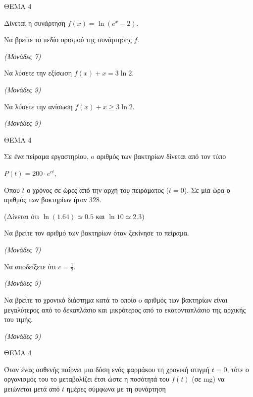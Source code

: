 \documentclass[11pt,a4paper,twoside]{book}
\newcommand{\monades}[1]{\hfill \textit{(Μονάδες #1)}}
\begin{document}
\vspace{4mm}

ΘΕΜΑ 4

Δίνεται η συνάρτηση $f(x) = \ln(e^x - 2)$.

\begin{alist}
\item Να βρείτε το πεδίο ορισμού της συνάρτησης $f$.

\monades{7}

\item Να λύσετε την εξίσωση $f(x) + x = 3\ln 2$.

\monades{9}

\item Να λύσετε την ανίσωση $f(x) + x \ge 3\ln 2$.

\monades{9}
\end{alist}

\vspace{4mm}

ΘΕΜΑ 4

Σε ένα πείραμα εργαστηρίου, o αριθμός των βακτηρίων δίνεται από τον τύπο

$P(t) = 200 \cdot e^{ct}$,

Όπου $t$ ο χρόνος σε ώρες από την αρχή του πειράματος ($t=0$). Σε μία ώρα ο αριθμός των βακτηρίων ήταν 328.

(Δίνεται ότι $\ln(1.64) \simeq 0.5$ και $\ln 10 \simeq 2.3$)

\begin{alist}
\item Να βρείτε τον αριθμό των βακτηρίων όταν ξεκίνησε το πείραμα.

\monades{7}

\item Να αποδείξετε ότι $c = \frac{1}{2}$.

\monades{9}

\item Να βρείτε το χρονικό διάστημα κατά το οποίο o αριθμός των βακτηρίων είναι μεγαλύτερος από το δεκαπλάσιο και μικρότερος από το εκατονταπλάσιο της αρχικής του τιμής.

\monades{9}
\end{alist}

\vspace{4mm}

ΘΕΜΑ 4

Όταν ένας ασθενής παίρνει μια δόση ενός φαρμάκου τη χρονική στιγμή $t = 0$, τότε ο οργανισμός του το μεταβολίζει έτσι ώστε η ποσότητά του $f(t)$ (σε mg) να μειώνεται μετά από $t$ ημέρες σύμφωνα με τη συνάρτηση
\end{document}
